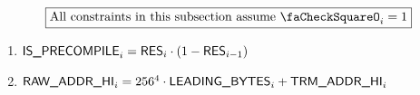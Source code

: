 \[
    \boxed{\text{All constraints in this subsection assume } \done_{i} = 1 }
\]
\begin{enumerate}
	\item $\textsf{IS\_PRECOMPILE}_{i} = \textsf{RES}_{i} \cdot (1 - \textsf{RES}_{i-1})$
	\item $\textsf{RAW\_ADDR\_HI}_{i} = 256^{4} \cdot \textsf{LEADING\_BYTES}_{i} + \textsf{TRM}\textsf{\_}\textsf{ADDR}\textsf{\_HI}_{i}$
\end{enumerate}	

